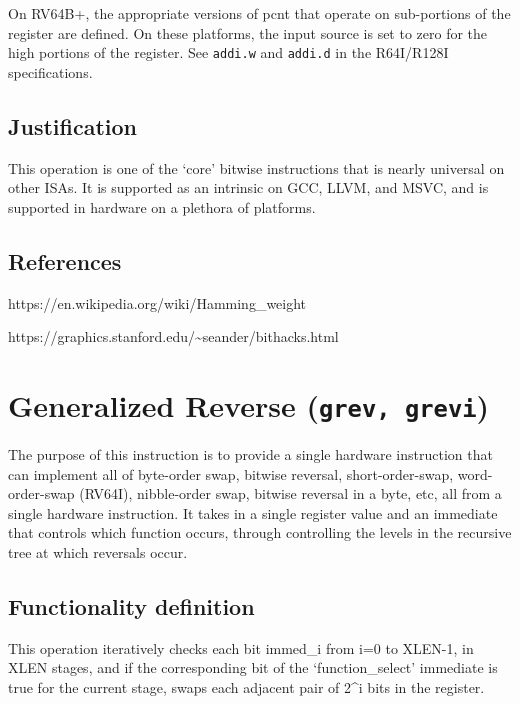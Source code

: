 On RV64B+, the appropriate versions of pcnt that operate on sub-portions
of the register are defined. On these platforms, the input source is set
to zero for the high portions of the register. See \texttt{addi.w} and
\texttt{addi.d} in the R64I/R128I specifications.

\subsection{Justification}

This operation is one of the `core' bitwise instructions that is nearly
universal on other ISAs. It is supported as an intrinsic on GCC, LLVM,
and MSVC, and is supported in hardware on a plethora of platforms.

\subsection{References}

https://en.wikipedia.org/wiki/Hamming\_weight

https://graphics.stanford.edu/\textasciitilde{}seander/bithacks.html


\section{Generalized Reverse (\texttt{grev,\ grevi})}

The purpose of this instruction is to provide a single hardware
instruction that can implement all of byte-order swap, bitwise reversal,
short-order-swap, word-order-swap (RV64I), nibble-order swap, bitwise
reversal in a byte, etc, all from a single hardware instruction. It
takes in a single register value and an immediate that controls which
function occurs, through controlling the levels in the recursive tree at
which reversals occur.

\subsection{Functionality definition}

This operation iteratively checks each bit immed\_i from i=0 to XLEN-1,
in XLEN stages, and if the corresponding bit of the `function\_select'
immediate is true for the current stage, swaps each adjacent pair of
2\^{}i bits in the register.

